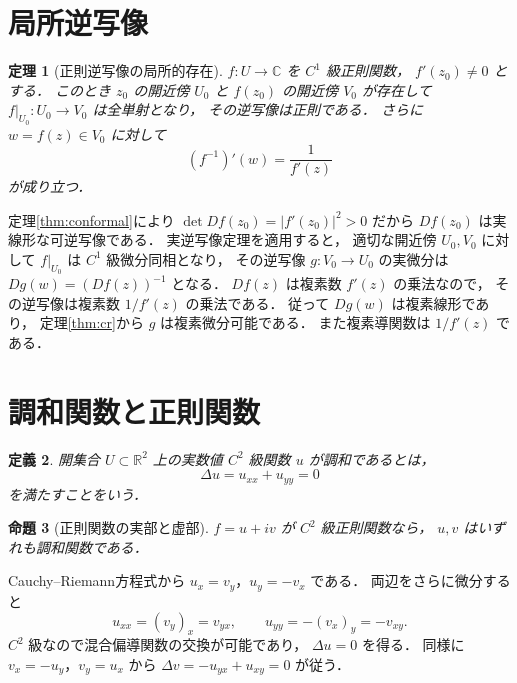 \documentclass[a5paper,10pt,onecolumn]{jsarticle}
\makeatletter
\theoremstyle{mathnotetheorem}
\newtheorem{theorem}{定理}[section]
\newtheorem{definition}[theorem]{定義}
\newtheorem{proposition}[theorem]{命題}
\renewcommand{\proofname}{証明}
\renewenvironment{proof}[1][\proofname]{%
  \par\pushQED{\qed}\normalfont\topsep4\p@\@plus2\p@\relax
  \trivlist\item[\hskip\labelsep\bfseries #1]\ignorespaces
}{\popQED\endtrivlist\@endpefalse}
\makeatother
\begin{document}
\section{局所逆写像}

\begin{theorem}[正則逆写像の局所的存在]\label{thm:local-inverse}
$f:U\to\mathbb C$ を $C^1$ 級正則関数，
$f'(z_0)\ne0$ とする．
このとき $z_0$ の開近傍 $U_0$ と
$f(z_0)$ の開近傍 $V_0$ が存在して
$f|_{U_0}:U_0\to V_0$ は全単射となり，
その逆写像は正則である．
さらに $w=f(z)\in V_0$ に対して
\[
 (f^{-1})'(w)=\frac1{f'(z)}
\]
が成り立つ．
\end{theorem}
\begin{proof}
定理\ref{thm:conformal}により
$\det Df(z_0)=|f'(z_0)|^2>0$ だから
$Df(z_0)$ は実線形な可逆写像である．
実逆写像定理を適用すると，
適切な開近傍 $U_0,V_0$ に対して
$f|_{U_0}$ は $C^1$ 級微分同相となり，
その逆写像 $g:V_0\to U_0$ の実微分は
$Dg(w)=(Df(z))^{-1}$ となる．
$Df(z)$ は複素数 $f'(z)$ の乗法なので，
その逆写像は複素数 $1/f'(z)$ の乗法である．
従って $Dg(w)$ は複素線形であり，
定理\ref{thm:cr}から $g$ は複素微分可能である．
また複素導関数は $1/f'(z)$ である．
\end{proof}

\section{調和関数と正則関数}

\begin{definition}
開集合 $U\subset\mathbb R^2$ 上の実数値
$C^2$ 級関数 $u$ が\emph{調和}であるとは，
\[
 \Delta u=u_{xx}+u_{yy}=0
\]
を満たすことをいう．
\end{definition}

\begin{proposition}[正則関数の実部と虚部]\label{prop:harmonic}
$f=u+iv$ が $C^2$ 級正則関数なら，
$u,v$ はいずれも調和関数である．
\end{proposition}
\begin{proof}
Cauchy--Riemann方程式から
$u_x=v_y$，$u_y=-v_x$ である．
両辺をさらに微分すると
\[
 u_{xx}=(v_y)_x=v_{yx},\qquad
 u_{yy}=-(v_x)_y=-v_{xy}.
\]
$C^2$ 級なので混合偏導関数の交換が可能であり，
$\Delta u=0$ を得る．
同様に
$v_x=-u_y$，$v_y=u_x$ から
$\Delta v=-u_{yx}+u_{xy}=0$ が従う．
\end{proof}
\end{document}
